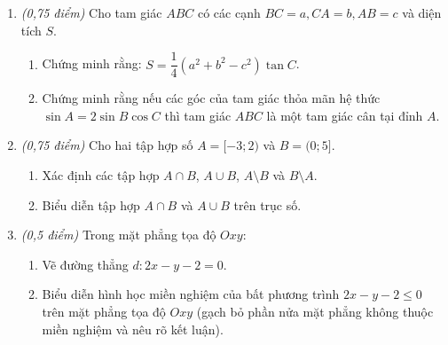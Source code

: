 \documentclass[12pt,a4paper]{article}
\newcommand{\parttitle}[1]{\par\vspace{2pt}{\large\bfseries\color{ink}#1}\par\vspace{1pt}}
\begin{document}
\begin{enumerate}[resume]
\begin{minipage}[t]{0.40\linewidth}
\end{minipage}

\item \textit{(0,75 điểm)} Cho tam giác $ABC$ có các cạnh $BC = a, CA = b, AB = c$ và diện tích $S$.
\begin{enumerate}
    \item Chứng minh rằng: $S = \dfrac{1}{4}(a^2 + b^2 - c^2)\tan C$.
    \item Chứng minh rằng nếu các góc của tam giác thỏa mãn hệ thức $\sin A = 2\sin B \cos C$ thì tam giác $ABC$ là một tam giác cân tại đỉnh $A$.
\end{enumerate}

\item \textit{(0,75 điểm)} Cho hai tập hợp số $A = [-3; 2)$ và $B = (0; 5]$.
\begin{enumerate}
    \item Xác định các tập hợp $A \cap B$, $A \cup B$, $A \setminus B$ và $B \setminus A$.
    \item Biểu diễn tập hợp $A \cap B$ và $A \cup B$ trên trục số.
\end{enumerate}

\item \textit{(0,5 điểm)} Trong mặt phẳng tọa độ $Oxy$:
\begin{enumerate}
    \item Vẽ đường thẳng $d: 2x - y - 2 = 0$.
    \item Biểu diễn hình học miền nghiệm của bất phương trình $2x - y - 2 \le 0$ trên mặt phẳng tọa độ $Oxy$ (gạch bỏ phần nửa mặt phẳng không thuộc miền nghiệm và nêu rõ kết luận).
\end{enumerate}
\end{enumerate}

\newpage
\parttitle{BẢNG ĐÁP ÁN TỔNG HỢP}
\end{document}
